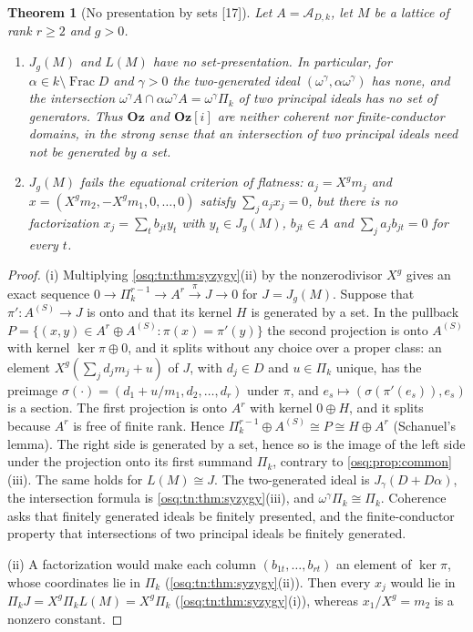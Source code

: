 \documentclass[11pt,letterpaper]{article}
\numberwithin{equation}{section}
\newtheorem{theorem}{Theorem}[section]
\theoremstyle{definition}
\theoremstyle{remark}
\theoremstyle{plain}
\newcommand{\Oz}{\mathbf{Oz}}
\newcommand{\GOz}{\Oz[i]}
\newcommand{\A}{\mathcal A}          %
\newcommand{\Frac}{\operatorname{Frac}}
\newcommand{\src}[1]{\textup{\textsf{[#1]}}}
\begin{document}
\begin{theorem}[No presentation by sets \src{17}]\label{osq:rel:thm:presentation}
Let $A=\A_{D,k}$, let $M$ be a lattice of rank $r\ge2$ and $g>0$.
\begin{enumerate}
\item $J_g(M)$ and $L(M)$ have no set-presentation. In particular, for $\alpha\in k\setminus\Frac D$ and $\gamma>0$ the
two-generated ideal $(\omega^\gamma,\alpha\omega^\gamma)$ has none, and the intersection
$\omega^\gamma A\cap\alpha\omega^\gamma A=\omega^\gamma\Pi_k$ of two principal ideals has no set of generators. Thus $\Oz$ and $\GOz$
are neither coherent nor finite-conductor domains, in the strong sense that an intersection of two principal ideals need not
be generated by a set.
\item $J_g(M)$ fails the equational criterion of flatness: $a_j=X^gm_j$ and $x=(X^gm_2,-X^gm_1,0,\dots,0)$ satisfy
$\sum_ja_jx_j=0$, but there is no factorization $x_j=\sum_tb_{jt}y_t$ with $y_t\in J_g(M)$, $b_{jt}\in A$ and $\sum_ja_jb_{jt}=0$
for every $t$.
\end{enumerate}
\end{theorem}
\begin{proof}
(i) Multiplying \cref{osq:tn:thm:syzygy}(ii) by the nonzerodivisor $X^g$ gives an exact sequence
$0\to\Pi_k^{r-1}\to A^r\xrightarrow{\pi}J\to0$ for $J=J_g(M)$. Suppose that $\pi':A^{(S)}\to J$ is onto and that its kernel $H$ is
generated by a set. In the pullback $P=\{(x,y)\in A^r\oplus A^{(S)}:\pi(x)=\pi'(y)\}$ the second projection is onto $A^{(S)}$ with
kernel $\ker\pi\oplus0$, and it splits without any choice over a proper class: an element $X^g(\sum_jd_jm_j+u)$ of $J$, with
$d_j\in D$ and $u\in\Pi_k$ unique, has the preimage $\sigma(\cdot)=(d_1+u/m_1,d_2,\dots,d_r)$ under $\pi$, and
$e_s\mapsto(\sigma(\pi'(e_s)),e_s)$ is a section. The first projection is onto $A^r$ with kernel $0\oplus H$, and it splits
because $A^r$ is free of finite rank. Hence $\Pi_k^{r-1}\oplus A^{(S)}\cong P\cong H\oplus A^r$ (Schanuel's lemma). The right side
is generated by a set, hence so is the image of the left side under the projection onto its first summand $\Pi_k$, contrary to
\cref{osq:prop:common}(iii). The same holds for $L(M)\cong J$. The two-generated ideal is $J_\gamma(D+D\alpha)$, the intersection
formula is \cref{osq:tn:thm:syzygy}(iii), and $\omega^\gamma\Pi_k\cong\Pi_k$. Coherence asks that finitely generated ideals be
finitely presented, and the finite-conductor property that intersections of two principal ideals be finitely generated.

(ii) A factorization would make each column $(b_{1t},\dots,b_{rt})$ an element of $\ker\pi$, whose coordinates lie in $\Pi_k$
(\cref{osq:tn:thm:syzygy}(ii)). Then every $x_j$ would lie in $\Pi_kJ=X^g\Pi_kL(M)=X^g\Pi_k$ (\cref{osq:tn:thm:syzygy}(i)), whereas
$x_1/X^g=m_2$ is a nonzero constant.
\end{proof}
\end{document}
